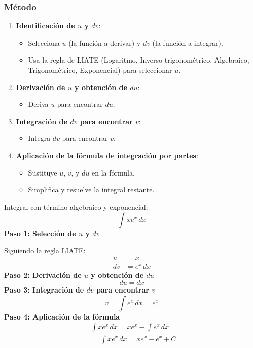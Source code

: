 \subsubsection{Método}
\begin{enumerate}
    \item \textbf{Identificación de \( u \) y \( dv \)}:
    \begin{itemize}
        \item Selecciona \( u \) (la función a derivar) y \( dv \) (la función a integrar).
        \item Usa la regla de LIATE (Logaritmo, Inverso trigonométrico, Algebraico, Trigonométrico, Exponencial) para seleccionar \( u \).
    \end{itemize}
    \item \textbf{Derivación de \( u \) y obtención de \( du \)}:
    \begin{itemize}
        \item Deriva \( u \) para encontrar \( du \).
    \end{itemize}
    \item \textbf{Integración de \( dv \) para encontrar \( v \)}:
    \begin{itemize}
        \item Integra \( dv \) para encontrar \( v \).
    \end{itemize}
    \item \textbf{Aplicación de la fórmula de integración por partes}:
    \begin{itemize}
        \item Sustituye \( u \), \( v \), y \( du \) en la fórmula.
        \item Simplifica y resuelve la integral restante.
    \end{itemize}
\end{enumerate}
\begin{example}
Integral con término algebraico y exponencial:
\begin{equation*}
    \int x e^x \, dx
\end{equation*}
    \textbf{Paso 1: Selección de \( u \) y \( dv \)}
    
    Siguiendo la regla LIATE:
    \begin{align*}
    u &= x \\
    dv &= e^x \, dx
    \end{align*}
\textbf{Paso 2: Derivación de \( u \) y obtención de \( du \)}
\begin{equation*}
    du = dx
\end{equation*}
    \textbf{Paso 3: Integración de \( dv \) para encontrar \( v \)}
\begin{equation*}
    v = \int e^x \, dx = e^x
\end{equation*}
    \textbf{Paso 4: Aplicación de la fórmula}
    \begin{align*}
        &\int x e^x \, dx = x e^x - \int e^x \, dx =\\
        &= \int x e^x \, dx = x e^x - e^x + C
    \end{align*}    
\end{example}
